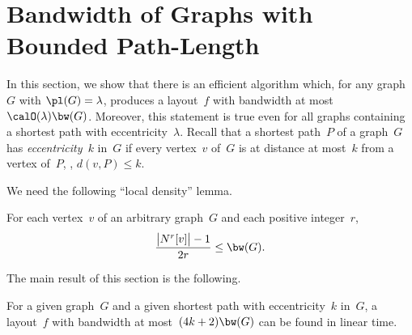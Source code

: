 \section{Bandwidth of Graphs with Bounded Path-Length}
    \label{sec:bw-vs-pl}

In this section, we show that there is an efficient algorithm which, for any graph~$G$ with $\pl(G) = \lambda$, produces a layout~$f$ with bandwidth at most~$\calO(\lambda) \bw(G)$.
Moreover, this statement is true even for all graphs containing a shortest path with eccentricity~$\lambda$.
Recall that a shortest path~$P$ of a graph~$G$ has \emph{eccentricity~\( k \)} in~$G$ if every vertex~$v$ of~$G$ is at distance at most~$k$ from a vertex of~$P$, \ie, $d(v, P) \leq k$.

We need the following ``local density'' lemma.

\begin{lemma}
    \label{lem:Discbandwidth}
For each vertex~\( v \) of an arbitrary graph~\( G \) and each positive integer~\( r \),
\[
    \frac{\big | N^r[v] \big | - 1}{2r} \leq \bw(G).
\]
\end{lemma}

The main result of this section is the following.

\begin{theorem}
    \label{theo:espBwApprox}
For a given graph~\( G \) and a given shortest path with eccentricity~\( k \) in~\( G \), a layout~\( f \) with bandwidth at most~\( (4k + 2) \bw(G) \) can be found in linear time.
\end{theorem}

